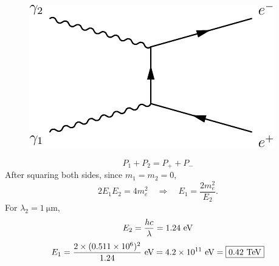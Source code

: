 \begin{figure}[H]
  \centering
  \includegraphics{feynmp/yy_ee.pdf}
\end{figure}

\begin{equation}
  P_1 + P_2 = P_{+} + P_{-}
\end{equation}
After squaring both sides, since $m_1=m_2=0$,
\begin{equation}
  2E_1E_2 = 4m_e^2 \quad \Rightarrow \quad E_1 = \frac{2m_e^2}{E_2}.
\end{equation}
%
For $\lambda_2 = \SI{1}{\micro\meter}$,
\begin{equation}
  E_2 = \frac{hc}{\lambda} = 1.24~\text{eV}
\end{equation}
\begin{equation}
  E_1 = \frac{2\times (0.511\times 10^6)^2}{1.24} ~\text{eV}
      = 4.2\times 10^{11} ~\text{eV} = \boxed{ 0.42 ~\text{TeV} }
\end{equation}

